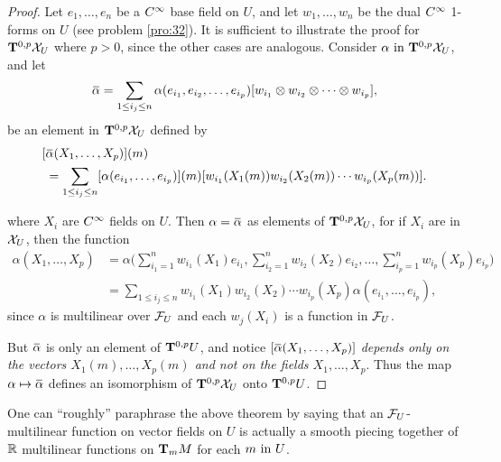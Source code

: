 \documentclass[../main]{subfiles}
\begin{document}
\begin{proof}
Let $e_1,\dots,e_n$ be a $\CInfty$ base field on $U$, and let $w_1,\dots,w_n$ be the dual $\CInfty$ 1-forms on $U$ (see problem \ref{pro:32}). It is sufficient to illustrate the proof for $\tensorbundle{\vectorFields_U}{0}{p}$ where $p>0$, since the other cases are analogous. Consider $\alpha \InText \tensorbundle{\vectorFields_U}{0}{p}$, and let
\[ \xoverline\alpha = \sum_{1\le i_j\le n} \alpha(e_{i_1}, e_{i_2},\dots,e_{i_p})[w_{i_1} \otimes w_{i_2} \otimes \cdots \otimes w_{i_p}],\]
be an element in $\tensorbundle{\vectorFields_U}{0}{p}$ defined by
\[ 
\begin{aligned}
[&\xoverline\alpha(X_1,\dots,X_p)](m) \\ 
&= \sum_{1\le i_j\le n} [\alpha(e_{i_1},\dots,e_{i_p})](m)[w_{i_1}(X_1(m)) w_{i_2}(X_2(m))\cdots w_{i_p}(X_p(m))].
\end{aligned}
\] 

where $X_i$ are $\CInfty$ fields on $U$. Then $\alpha =\xoverline\alpha$ as elements of $\tensorbundle{\vectorFields_U}{0}{p}$, for if $X_i$ are in $\vectorFields_U$, then the function
\[
\begin{aligned}
\alpha(X_1,\dots,X_p) &= \alpha\bigg( \sum_{i_1=1}^n w_{i_1}(X_1)e_{i_1}, \sum_{i_2=1}^n w_{i_2}(X_2)e_{i_2}, \dots, \sum_{i_p=1}^n w_{i_p}(X_p)e_{i_p} \bigg)\\
&= \sum_{1\le i_j\le n}w_{i_1}(X_1)w_{i_2}(X_2)\cdots w_{i_p}(X_p)\alpha(e_{i_1},\dots,e_{i_p}),
\end{aligned}
\]
since $\alpha$ is multilinear over $\realFunctions_U$ and each $w_j(X_i)$ is a function in $\realFunctions_U$.

But $\xoverline\alpha$ is only an element of $\tensorbundle{U}{0}{p}$, and notice $[\xoverline\alpha(X_1,\dots,X_p)]$ \emph{depends only on the vectors $X_1(m),\dots,X_p(m)$ and not on the fields $X_1, \dots, X_p$}. Thus the map $\alpha\mapsto\xoverline\alpha$ defines an isomorphism of $\tensorbundle{\vectorFields_U}{0}{p}$ onto $\tensorbundle{U}{0}{p}$. 
\end{proof}



One can ``roughly'' paraphrase the above theorem by saying that an $\realFunctions_U$-multilinear function on vector fields on $U$ is actually a smooth piecing together of $\bR$ multilinear functions on $\tangentspace{M}{m}$ for each $m \InText U$. 
\end{document}
